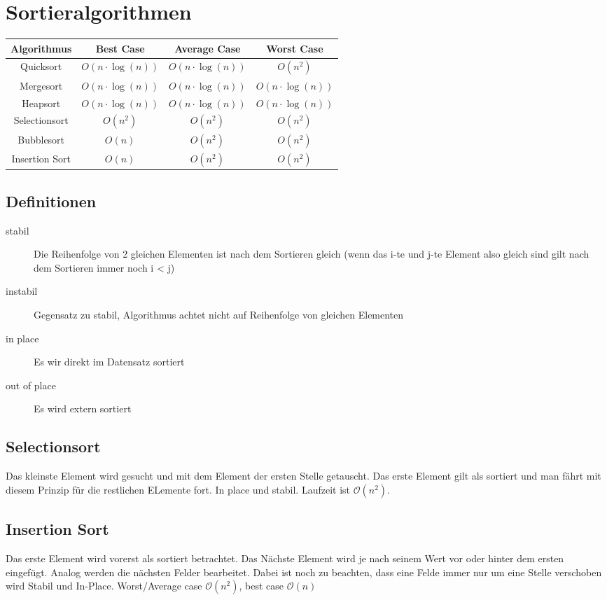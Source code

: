 \documentclass[a4paper]{scrartcl}
\begin{document}
    \section{Sortieralgorithmen}
    \begin{tabular}{|c|c|c|c|}
        \hline
        Algorithmus & Best Case & Average Case & Worst Case \\
        \hline
        Quicksort & $O(n \cdot \log(n))$ & $O(n \cdot \log(n))$ & $O(n^2)$ \\
        Mergesort & $O(n \cdot \log(n))$ & $O(n \cdot \log(n))$ & $O(n \cdot \log(n))$ \\
        Heapsort & $O(n \cdot \log(n))$ & $O(n \cdot \log(n))$ & $O(n \cdot \log(n))$ \\
        Selectionsort & $O(n^2)$ & $O(n^2)$ & $O(n^2)$ \\
        Bubblesort & $O(n)$ & $O(n^2)$ & $O(n^2)$ \\
        Insertion Sort & $O(n)$ & $O(n^2)$ & $O(n^2)$ \\
        \hline
    \end{tabular}

    \subsection{Definitionen}
        \begin{description}
            \item[stabil] Die Reihenfolge von 2 gleichen Elementen ist nach dem Sortieren gleich (wenn das i-te und j-te Element also gleich sind gilt nach dem Sortieren immer noch i < j)
            \item[instabil] Gegensatz zu stabil, Algorithmus achtet nicht auf Reihenfolge von gleichen Elementen
            \item[in place] Es wir direkt im Datensatz sortiert
            \item[out of place] Es wird extern sortiert  
        \end{description}
    
        \subsection{Selectionsort}
            Das kleinste Element wird gesucht und mit dem Element der ersten Stelle getauscht. Das erste Element gilt als sortiert und man fährt mit diesem Prinzip
            für die restlichen ELemente fort. In place und stabil. Laufzeit ist \(\mathcal{O}(n^2)\).
        \subsection{Insertion Sort} 
            Das erste Element wird vorerst als sortiert betrachtet. Das Nächste Element wird je nach seinem Wert vor oder hinter dem ersten eingefügt. Analog werden die nächsten
            Felder bearbeitet. Dabei ist noch zu beachten, dass eine Felde immer nur um eine Stelle verschoben wird
            Stabil und In-Place. Worst/Average case \(\mathcal{O}(n^2)\), best case \(\mathcal{O}(n)\)
\end{document}
